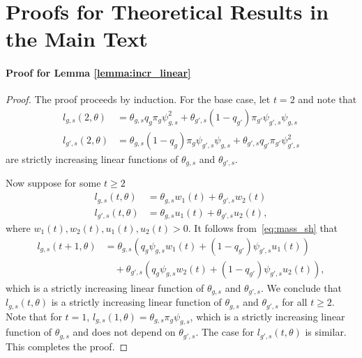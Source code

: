 \documentclass[letterpaper]{article} %
\begin{document}
\section{Proofs for Theoretical Results in the Main Text}\label{sec:proofs}

\paragraph{Proof for Lemma \ref{lemma:incr_linear}}
\begin{proof}
The proof proceeds by induction. For the base case, let $t=2$ and note that
\begin{align*}
    l_{g,s}(2,\theta) &= \theta_{g,s}q_g \pi_g \psi_{g,s}^2 + \theta_{g',s}(1-q_{g'})\pi_{g'}\psi_{g',s}\psi_{g,s} \\
    l_{g',s}(2,\theta) &= \theta_{g,s}(1-q_{g})\pi_{g}\psi_{g',s}\psi_{g,s} + \theta_{g',s}q_{g'} \pi_{g'} \psi_{g',s}^2 
\end{align*}
are strictly increasing linear functions of $\theta_{g,s}$ and $\theta_{g',s}$.

Now suppose for some $t \geq 2$
\begin{align*}
    l_{g,s}(t,\theta) &= \theta_{g,s}w_1(t) + \theta_{g',s}w_2(t) \\
    l_{g',s}(t,\theta) &= \theta_{g,s}u_1(t) + \theta_{g',s}u_2(t), 
\end{align*}
where $w_1(t), w_2(t), u_1(t), u_2(t) > 0$. It follows from~\eqref{eq:mass_sh} that
\begin{align*}
    l_{g,s}(t+1,\theta) &= \theta_{g,s}\left( q_g \psi_{g,s} w_1(t) + (1-q_{g'})\psi_{g',s}u_1(t)\right) \\
    &\quad + \theta_{g',s}\left( q_g \psi_{g,s} w_2(t) + (1-q_{g'})\psi_{g',s}u_2(t)\right),
\end{align*}
which is a strictly increasing linear function of $\theta_{g,s}$ and $\theta_{g',s}$. We conclude that $l_{g,s}(t,\theta)$ is a strictly increasing linear function of $\theta_{g,s}$ and $\theta_{g',s}$ for all $t\geq 2$. Note that for $t=1$, $l_{g,s}(1,\theta) = \theta_{g,s}\pi_g \psi_{g,s}$, which is a strictly increasing linear function of $\theta_{g,s}$ and does not depend on $\theta_{g',s}$. The case for $l_{g',s}(t,\theta)$ is similar. This completes the proof.
\end{proof}
\end{document}
